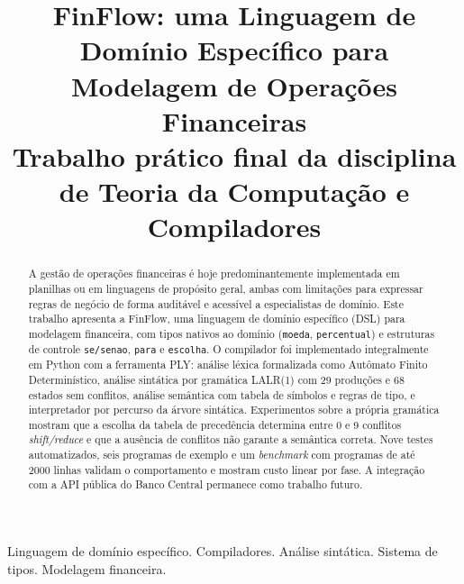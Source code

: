 \documentclass[conference]{IEEEtran}
\begin{document}
\renewcommand{\abstractname}{Resumo}
\renewcommand{\IEEEkeywordsname}{Palavras-chave}
\renewcommand{\refname}{Referências}

\title{FinFlow: uma Linguagem de Domínio Específico para Modelagem de Operações Financeiras\\
\large *Trabalho prático final da disciplina de Teoria da Computação e Compiladores}

\author{
}

\maketitle

\begin{abstract}
A gestão de operações financeiras é hoje predominantemente implementada em planilhas ou em linguagens de propósito geral, ambas com limitações para expressar regras de negócio de forma auditável e acessível a especialistas de domínio. Este trabalho apresenta a FinFlow, uma linguagem de domínio específico (DSL) para modelagem financeira, com tipos nativos ao domínio (\texttt{moeda}, \texttt{percentual}) e estruturas de controle \texttt{se/senao}, \texttt{para} e \texttt{escolha}. O compilador foi implementado integralmente em Python com a ferramenta PLY: análise léxica formalizada como Autômato Finito Determinístico, análise sintática por gramática LALR(1) com 29 produções e 68 estados sem conflitos, análise semântica com tabela de símbolos e regras de tipo, e interpretador por percurso da árvore sintática. Experimentos sobre a própria gramática mostram que a escolha da tabela de precedência determina entre 0 e 9 conflitos \textit{shift/reduce} e que a ausência de conflitos não garante a semântica correta. Nove testes automatizados, seis programas de exemplo e um \textit{benchmark} com programas de até 2000 linhas validam o comportamento e mostram custo linear por fase. A integração com a API pública do Banco Central permanece como trabalho futuro.
\end{abstract}

\begin{IEEEkeywords}
Linguagem de domínio específico. Compiladores. Análise sintática. Sistema de tipos. Modelagem financeira.
\end{IEEEkeywords}
\end{document}
